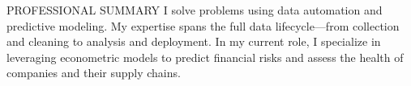 \begin{rSection}{PROFESSIONAL SUMMARY}
    I solve problems using data automation and predictive modeling. My expertise spans the full data lifecycle—from collection and cleaning to analysis and deployment. In my current role, I specialize in leveraging econometric models to predict financial risks and assess the health of companies and their supply chains.
\end{rSection}